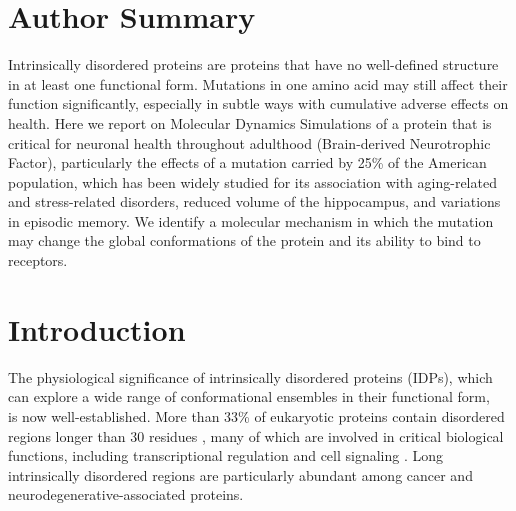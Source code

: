 \documentclass[10pt,letterpaper]{article}
\begin{document}
\section*{Author Summary}
Intrinsically disordered proteins are proteins that have no well-defined structure in at least one functional form. Mutations in one amino acid may still affect their function significantly, especially in subtle ways with cumulative adverse effects on health.  Here we report on Molecular Dynamics Simulations of a protein that is critical for neuronal health throughout adulthood (Brain-derived Neurotrophic Factor), particularly the effects of a mutation carried by 25\% of the American population, which has been widely studied for its association with aging-related and stress-related disorders, reduced volume of the hippocampus, and variations in episodic memory. We identify a molecular mechanism in which the mutation may change the global conformations of the protein and its ability to bind to receptors. %

\linenumbers

\section*{Introduction}

The physiological significance of intrinsically disordered proteins (IDPs), which can explore a wide range of conformational ensembles in their functional form, ~\cite {Uversky2013a,Panchenko2015,Ward2004a,Dyson2005a} is now well-established. More than 33\% of eukaryotic proteins contain disordered regions longer than 30 residues \cite{Ward2004b}, many of which are involved in critical biological functions, including transcriptional regulation and cell signaling \cite{Dunker2005}.  Long intrinsically disordered regions are particularly abundant among cancer and neurodegenerative-associated proteins\cite{Habchi2014,Babu2011}.  
\end{document}
